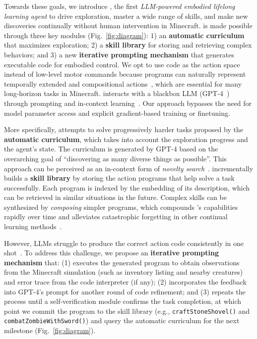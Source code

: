 

Towards these goals, we introduce \voyager, the first \textit{LLM-powered embodied lifelong learning agent} to drive exploration, master a wide range of skills, and make new discoveries continually without human intervention in Minecraft. 
\voyager is made possible through three key modules (Fig.~\ref{fig:diagram}): 1) an \textbf{automatic curriculum} that maximizes exploration; 2) a \textbf{skill library} for storing and retrieving complex behaviors; and 3) a new \textbf{iterative prompting mechanism} that generates executable code for embodied control.
We opt to use code as the action space instead of low-level motor commands because programs can naturally represent temporally extended and compositional actions~\cite{liang2022code,singh2022progprompt}, which are essential for many long-horizon tasks in Minecraft. 
\voyager interacts with a blackbox LLM (GPT-4~\cite{openai2023gpt4}) through prompting and in-context learning~\cite{wei2022emergent,brown2020gpt3,raffel2020t5}. Our approach bypasses the need for model parameter access and explicit gradient-based training or finetuning.

More specifically, \voyager attempts to solve progressively harder tasks proposed by the \textbf{automatic curriculum}, which takes into account the exploration progress and the agent's state. The curriculum is generated by GPT-4 based on the overarching goal of ``discovering as many diverse things as possible''. This approach can be perceived as an in-context form of \textit{novelty search}~\cite{eysenbach2018diversity,conti2018novelty}.
\voyager incrementally builds a \textbf{skill library} by storing the action programs that help solve a task successfully. Each program is indexed by the embedding of its description, which can be retrieved in similar situations in the future. Complex skills can be synthesized by \textit{composing} simpler programs, which compounds \voyager's capabilities rapidly over time and alleviates catastrophic forgetting in other continual learning methods~\cite{parisi2023continual,wang2023comprehensive}. 

However, LLMs struggle to produce the correct action code consistently in one shot~\cite{openai2021codex}. To address this challenge, we propose an \textbf{iterative prompting mechanism} that: (1) executes the generated program to obtain observations from the Minecraft simulation (such as inventory listing and nearby creatures) and error trace from the code interpreter (if any); (2) incorporates the feedback into GPT-4's prompt for another round of code refinement; and (3) repeats the process until a self-verification module confirms the task completion, at which point we commit the program to the skill library (e.g., \texttt{craftStoneShovel()} and \texttt{combatZombieWithSword()}) and query the automatic curriculum for the next milestone (Fig.~\ref{fig:diagram}).

